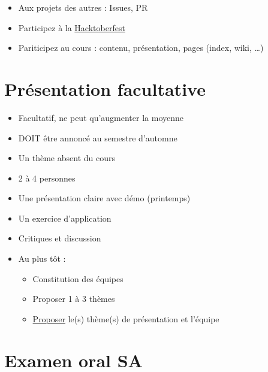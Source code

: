 \begin{itemize}
\tightlist
\item
  Aux projets des autres : Issues, PR
\item
  Participez à la
  \href{https://hacktoberfest.digitalocean.com/}{Hacktoberfest}
\item
  Pariticipez au cours : contenu, présentation, pages (index, wiki,
  \ldots)
\end{itemize}

\hypertarget{pruxe9sentation-facultative}{%
\section{Présentation facultative}\label{pruxe9sentation-facultative}}

\begin{itemize}
\tightlist
\item
  Facultatif, ne peut qu'augmenter la moyenne
\item
  DOIT être annoncé au semestre d'automne
\item
  Un thème absent du cours
\item
  2 à 4 personnes
\item
  Une présentation claire avec démo (printemps)
\item
  Un exercice d'application
\item
  Critiques et discussion
\item
  Au plus tôt :

  \begin{itemize}
  \tightlist
  \item
    Constitution des équipes
  \item
    Proposer 1 à 3 thèmes
  \item
    \href{https://docs.google.com/spreadsheet/viewform?formkey=dEVJRE1WVTVPelhFcE94TGF5N1c0cGc6MQ}{Proposer}
    le(s) thème(s) de présentation et l'équipe
  \end{itemize}
\end{itemize}

\hypertarget{examen-oral-sa}{%
\section{Examen oral SA}\label{examen-oral-sa}}

